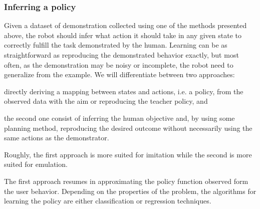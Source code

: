 \subsubsection*{Inferring a policy}

Given a dataset of demonstration collected using one of the methods presented above, the robot should infer what action it should take in any given state to correctly fulfill the task demonstrated by the human. Learning can be as straightforward as reproducing the demonstrated behavior exactly, but most often, as the demonstration may be noisy or incomplete, the robot need to generalize from the example. We will differentiate between two approaches: \begin{inparaenum}[(a)] \item directly deriving a mapping between states and actions, i.e. a policy, from the observed data with the aim or reproducing the teacher policy, and \item the second one consist of inferring the human objective and, by using some planning method, reproducing the desired outcome without necessarily using the same actions as the demonstrator. \end{inparaenum} Roughly, the first approach is more suited for imitation while the second is more suited for emulation. 

The first approach resumes in approximating the policy function observed form the user behavior. Depending on the properties of the problem, the algorithms for learning the policy are either classification or regression techniques. 

